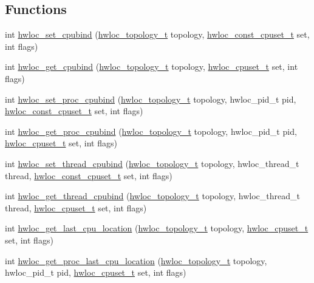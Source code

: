 \subsection*{Functions}
\begin{DoxyCompactItemize}
\item 
 int \hyperlink{a00049_gaf4cc194d5c0d38004a21b9f03522a7e3}{hwloc\_\-set\_\-cpubind} (\hyperlink{a00039_ga9d1e76ee15a7dee158b786c30b6a6e38}{hwloc\_\-topology\_\-t} topology, \hyperlink{a00040_ga1f784433e9b606261f62d1134f6a3b25}{hwloc\_\-const\_\-cpuset\_\-t} set, int flags)
\item 
 int \hyperlink{a00049_gab52f83ab16eac465da55e16bdd30df77}{hwloc\_\-get\_\-cpubind} (\hyperlink{a00039_ga9d1e76ee15a7dee158b786c30b6a6e38}{hwloc\_\-topology\_\-t} topology, \hyperlink{a00040_ga4bbf39b68b6f568fb92739e7c0ea7801}{hwloc\_\-cpuset\_\-t} set, int flags)
\item 
 int \hyperlink{a00049_gac0ef3510b4e9c1273029ecf94e8c9686}{hwloc\_\-set\_\-proc\_\-cpubind} (\hyperlink{a00039_ga9d1e76ee15a7dee158b786c30b6a6e38}{hwloc\_\-topology\_\-t} topology, hwloc\_\-pid\_\-t pid, \hyperlink{a00040_ga1f784433e9b606261f62d1134f6a3b25}{hwloc\_\-const\_\-cpuset\_\-t} set, int flags)
\item 
 int \hyperlink{a00049_gaa1373a002b9a0a87eb002e26c590f2da}{hwloc\_\-get\_\-proc\_\-cpubind} (\hyperlink{a00039_ga9d1e76ee15a7dee158b786c30b6a6e38}{hwloc\_\-topology\_\-t} topology, hwloc\_\-pid\_\-t pid, \hyperlink{a00040_ga4bbf39b68b6f568fb92739e7c0ea7801}{hwloc\_\-cpuset\_\-t} set, int flags)
\item 
 int \hyperlink{a00049_gaab65c34a0bc19c5a823f824543cedbd4}{hwloc\_\-set\_\-thread\_\-cpubind} (\hyperlink{a00039_ga9d1e76ee15a7dee158b786c30b6a6e38}{hwloc\_\-topology\_\-t} topology, hwloc\_\-thread\_\-t thread, \hyperlink{a00040_ga1f784433e9b606261f62d1134f6a3b25}{hwloc\_\-const\_\-cpuset\_\-t} set, int flags)
\item 
 int \hyperlink{a00049_ga089cecfdb9a50e5c5cd1b6ff17352d42}{hwloc\_\-get\_\-thread\_\-cpubind} (\hyperlink{a00039_ga9d1e76ee15a7dee158b786c30b6a6e38}{hwloc\_\-topology\_\-t} topology, hwloc\_\-thread\_\-t thread, \hyperlink{a00040_ga4bbf39b68b6f568fb92739e7c0ea7801}{hwloc\_\-cpuset\_\-t} set, int flags)
\item 
 int \hyperlink{a00049_ga8e9a4b5ee3eaa18fd3a229790c6b5b17}{hwloc\_\-get\_\-last\_\-cpu\_\-location} (\hyperlink{a00039_ga9d1e76ee15a7dee158b786c30b6a6e38}{hwloc\_\-topology\_\-t} topology, \hyperlink{a00040_ga4bbf39b68b6f568fb92739e7c0ea7801}{hwloc\_\-cpuset\_\-t} set, int flags)
\item 
 int \hyperlink{a00049_ga1e005ddb9701e6a993a9eb8abe67a710}{hwloc\_\-get\_\-proc\_\-last\_\-cpu\_\-location} (\hyperlink{a00039_ga9d1e76ee15a7dee158b786c30b6a6e38}{hwloc\_\-topology\_\-t} topology, hwloc\_\-pid\_\-t pid, \hyperlink{a00040_ga4bbf39b68b6f568fb92739e7c0ea7801}{hwloc\_\-cpuset\_\-t} set, int flags)
\end{DoxyCompactItemize}


